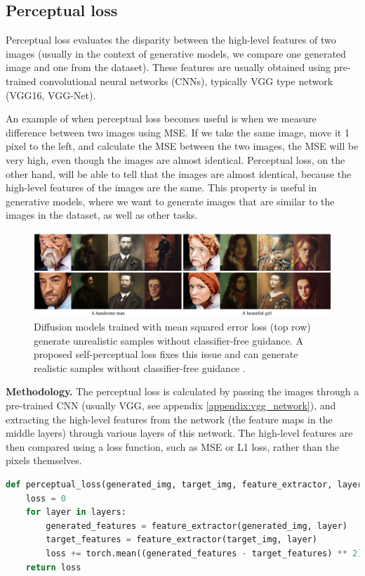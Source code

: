 \subsection{Perceptual loss}
\label{appendix:perceptual_loss}

Perceptual loss evaluates the disparity between the high-level features of two images (usually in the context of generative models, we compare one generated image and one from the dataset). These features are usually obtained using pre-trained convolutional neural networks (CNNs), typically VGG type network (VGG16, VGG-Net).

An example of when perceptual loss becomes useful is when we measure difference between two images using MSE. If we take the same image, move it 1 pixel to the left, and calculate the MSE between the two images, the MSE will be very high, even though the images are almost identical. Perceptual loss, on the other hand, will be able to tell that the images are almost identical, because the high-level features of the images are the same. This property is useful in generative models, where we want to generate images that are similar to the images in the dataset, as well as other tasks.

\begin{figure}
    \centering
    \includegraphics[width=1\textwidth]{images/appendix/perceptual_loss.png}
    \caption{Diffusion models trained with mean squared error loss (top row) generate unrealistic samples without classifier-free guidance. A proposed self-perceptual loss fixes this issue and can generate realistic samples without classifier-free guidance \cite{perceptual_loss_in_diffusion}.}
\end{figure}

\textbf{Methodology.} The perceptual loss is calculated by passing the images through a pre-trained CNN (usually VGG, see appendix \ref{appendix:vgg_network}), and extracting the high-level features from the network (the feature maps in the middle layers) through various layers of this network. The high-level features are then compared using a loss function, such as MSE or L1 loss, rather than the pixels themselves. 



\begin{lstlisting}[language=Python, caption={Example of perceptual loss implementation. Typically we don't compare the lower layers, since they contain pixel level features, and not semantics.}]
def perceptual_loss(generated_img, target_img, feature_extractor, layers):
    loss = 0
    for layer in layers:
        generated_features = feature_extractor(generated_img, layer)
        target_features = feature_extractor(target_img, layer)
        loss += torch.mean((generated_features - target_features) ** 2)
    return loss
\end{lstlisting}
